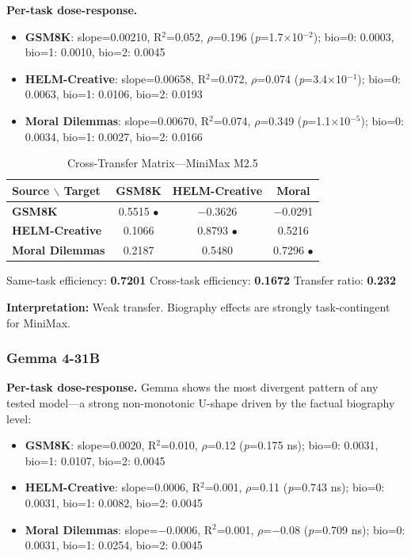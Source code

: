 \documentclass[11pt,a4paper]{article}
\begin{document}
\textbf{Per-task dose-response.}
\begin{itemize}[nosep]
\item \textbf{GSM8K}: slope=0.00210, R$^2$=0.052, $\rho$=0.196 (\textit{p}=1.7$\times$10$^{-2}$); bio=0: 0.0003, bio=1: 0.0010, bio=2: 0.0045
\item \textbf{HELM-Creative}: slope=0.00658, R$^2$=0.072, $\rho$=0.074 (\textit{p}=3.4$\times$10$^{-1}$); bio=0: 0.0063, bio=1: 0.0106, bio=2: 0.0193
\item \textbf{Moral Dilemmas}: slope=0.00670, R$^2$=0.074, $\rho$=0.349 (\textit{p}=1.1$\times$10$^{-5}$); bio=0: 0.0034, bio=1: 0.0027, bio=2: 0.0166
\end{itemize}

\begin{table}[H]
\centering
\caption{Cross-Transfer Matrix---MiniMax M2.5}
\label{tab:ct_minimax}
\begin{tabular}{lccc}
\toprule
\textbf{Source $\backslash$ Target} & \textbf{GSM8K} & \textbf{HELM-Creative} & \textbf{Moral} \\
\midrule
\textbf{GSM8K} & 0.5515 $\bullet$ & $-$0.3626 & $-$0.0291 \\
\textbf{HELM-Creative} & 0.1066 & 0.8793 $\bullet$ & 0.5216 \\
\textbf{Moral Dilemmas} & 0.2187 & 0.5480 & 0.7296 $\bullet$ \\
\bottomrule
\end{tabular}
\end{table}

Same-task efficiency: \textbf{0.7201} \quad Cross-task efficiency: \textbf{0.1672} \quad Transfer ratio: \textbf{0.232}

\textbf{Interpretation:} Weak transfer. Biography effects are strongly task-contingent for MiniMax.

\subsubsection{Gemma 4-31B}

\textbf{Per-task dose-response.} Gemma shows the most divergent pattern of any tested model---a strong non-monotonic U-shape driven by the factual biography level:
\begin{itemize}[nosep]
\item \textbf{GSM8K}: slope=0.0020, R$^2$=0.010, $\rho$=0.12 (\textit{p}=0.175 ns); bio=0: 0.0031, bio=1: 0.0107, bio=2: 0.0045
\item \textbf{HELM-Creative}: slope=0.0006, R$^2$=0.001, $\rho$=0.11 (\textit{p}=0.743 ns); bio=0: 0.0031, bio=1: 0.0082, bio=2: 0.0045
\item \textbf{Moral Dilemmas}: slope=$-$0.0006, R$^2$=0.001, $\rho$=$-$0.08 (\textit{p}=0.709 ns); bio=0: 0.0031, bio=1: 0.0254, bio=2: 0.0045
\end{itemize}
\end{document}

